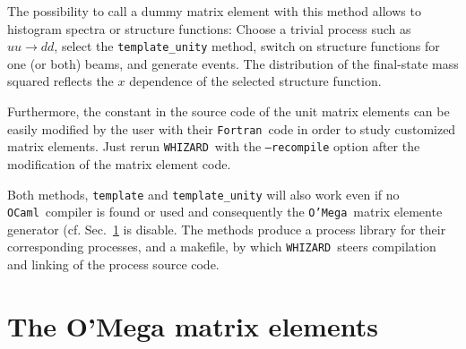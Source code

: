 \documentclass[12pt]{book}
\newcommand{\ttt}[1]{\texttt{#1}}
\newcommand{\whizard}{\ttt{WHIZARD}}
\newcommand{\oMega}{\ttt{O'Mega}}
\newcommand{\fortran}{\ttt{Fortran}}
\newcommand{\ocaml}{\ttt{OCaml}}
\begin{document}
The possibility to call a dummy matrix element with this method allows
to histogram spectra or structure functions: Choose a trivial process
such as $uu\to dd$, select the \ttt{template\_unity} method, switch
on structure functions for one (or both) beams, and generate events.
The distribution of the final-state mass squared reflects the $x$
dependence of the selected structure function.

Furthermore, the constant in the source code of the unit matrix
elements can be easily modified by the user with their \fortran\ code
in order to study customized matrix elements. Just rerun
\whizard\ with the \ttt{--recompile} option after the modification of
the matrix element code.

Both methods, \ttt{template} and \ttt{template\_unity} will also work
even if no \ocaml\ compiler is found or used and consequently the
\oMega\ matrix elemente generator (cf. Sec.~\ref{sec:omega_me} is
disable. The methods produce a process library for their corresponding
processes, and a makefile, by  which \whizard\ steers compilation and
linking of the process source code.


\section{The O'Mega matrix elements}
\label{sec:omega_me}
\end{document}
